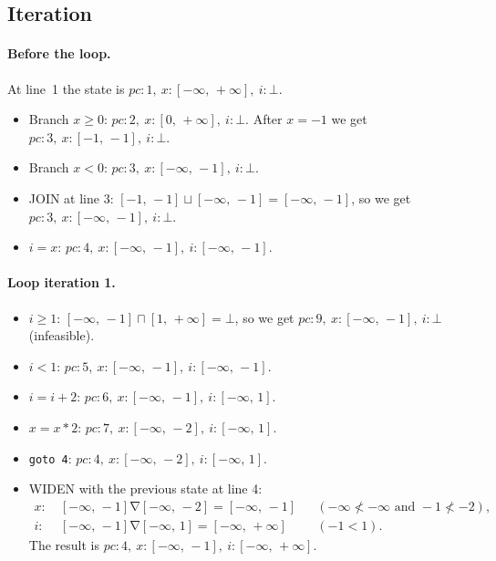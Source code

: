 \documentclass[11pt,a4paper]{article}
\newcommand{\st}[3]{$\mathit{pc}\colon #1,\allowbreak\ x\colon #2,\allowbreak\ i\colon #3$}
\newcommand{\itv}[2]{[#1,\,#2]}
\newcommand{\ninf}{-\infty}
\newcommand{\pinf}{+\infty}
\begin{document}
\subsection*{Iteration}

\paragraph{Before the loop.}
At line~1 the state is \st{1}{\itv{\ninf}{\pinf}}{\bot}.
\begin{itemize}
  \item Branch $x \ge 0$: \st{2}{\itv{0}{\pinf}}{\bot}. After $x = -1$ we get \st{3}{\itv{-1}{-1}}{\bot}.
  \item Branch $x < 0$: \st{3}{\itv{\ninf}{-1}}{\bot}.
  \item JOIN at line 3: $\itv{-1}{-1} \sqcup \itv{\ninf}{-1} = \itv{\ninf}{-1}$, so we get \st{3}{\itv{\ninf}{-1}}{\bot}.
  \item $i = x$: \st{4}{\itv{\ninf}{-1}}{\itv{\ninf}{-1}}.
\end{itemize}

\paragraph{Loop iteration 1.}
\begin{itemize}
  \item $i \ge 1$: $\itv{\ninf}{-1} \sqcap \itv{1}{\pinf} = \bot$, so we get \st{9}{\itv{\ninf}{-1}}{\bot} (infeasible).
  \item $i < 1$: \st{5}{\itv{\ninf}{-1}}{\itv{\ninf}{-1}}.
  \item $i = i + 2$: \st{6}{\itv{\ninf}{-1}}{\itv{\ninf}{1}}.
  \item $x = x * 2$: \st{7}{\itv{\ninf}{-2}}{\itv{\ninf}{1}}.
  \item \texttt{goto 4}: \st{4}{\itv{\ninf}{-2}}{\itv{\ninf}{1}}.
  \item WIDEN with the previous state at line 4:
        \begin{align*}
          x\colon\ & \itv{\ninf}{-1} \mathbin{\nabla} \itv{\ninf}{-2} = \itv{\ninf}{-1}
            && (\ninf \nless \ninf \text{ and } -1 \nless -2), \\
          i\colon\ & \itv{\ninf}{-1} \mathbin{\nabla} \itv{\ninf}{1} = \itv{\ninf}{\pinf}
            && (-1 < 1).
        \end{align*}
        The result is \st{4}{\itv{\ninf}{-1}}{\itv{\ninf}{\pinf}}.
\end{itemize}
\end{document}
